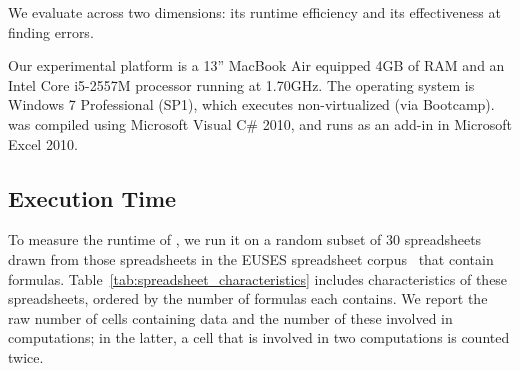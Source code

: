 We evaluate \checkcell{} across two dimensions: its runtime efficiency
and its effectiveness at finding errors.

Our experimental platform is a 13'' MacBook Air equipped 4GB of RAM
and an Intel Core i5-2557M processor running at 1.70GHz. The operating
system is Windows 7 Professional (SP1), which executes non-virtualized
(via Bootcamp). \checkcell{} was compiled using Microsoft Visual C\#
2010, and runs as an add-in in Microsoft Excel 2010.

\subsection{Execution Time}

To measure the runtime of \checkcell{}, we run it on a random subset
of 30 spreadsheets drawn from those spreadsheets in the EUSES
spreadsheet corpus~\cite{Fisher:2005:ESC:1082983.1083242} that contain
formulas.  Table~\ref{tab:spreadsheet_characteristics} includes
characteristics of these spreadsheets, ordered by the number of
formulas each contains. We report the raw number of cells containing
data and the number of these involved in computations; in the latter,
a cell that is involved in two computations is counted twice.

